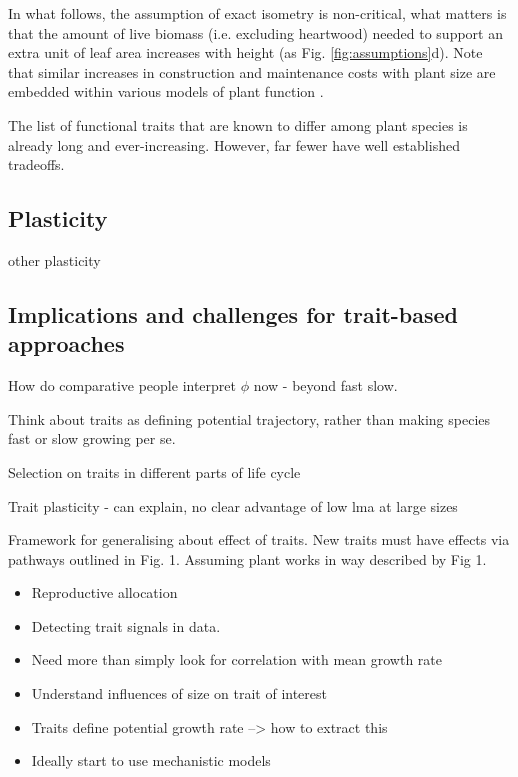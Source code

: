 \documentclass[a4paper,11pt]{article}
\begin{document}
In what follows, the assumption of exact isometry is non-critical, what matters is that the amount of live biomass (i.e. excluding heartwood) needed to support an extra unit of leaf area increases with height (as Fig. \ref{fig:assumptions}d).  Note that similar increases in construction and maintenance costs with plant size are embedded within various models of plant function \citep[e.g.][]{Givnish-1988, Makela-1997}.


The list of functional traits that are known to differ among plant species is already long and ever-increasing. However, far fewer have well established tradeoffs.

\subsection{Plasticity}

other plasticity \citep{Thomas-2010}

\subsection{Implications and challenges for trait-based approaches}

How do comparative people interpret $\phi$ now - beyond fast slow.

Think about traits as defining potential trajectory, rather than making
species fast or slow growing per se.

Selection on traits in different parts of life cycle

Trait plasticity - can explain, no clear advantage of low lma at large
sizes

Framework for generalising about effect of traits. New traits must have effects via pathways outlined in Fig. 1. Assuming plant works in way described by Fig 1.

\begin{itemize}
\item Reproductive allocation
\item Detecting trait signals in data.
\item Need more than simply look for correlation with mean growth rate
\item Understand influences of size on trait of interest
\item Traits define potential growth rate --\textgreater{} how to extract
  this
\item Ideally start to use mechanistic models
\end{itemize}
\end{document}
